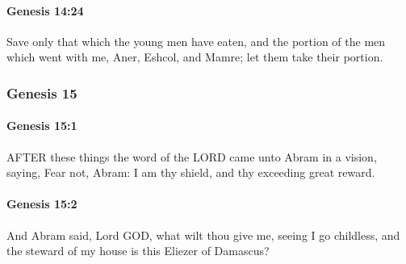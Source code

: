 		\paragraph{Genesis 14:24} %
			\label{GENESIS-14-24}

			Save only that which the young men have eaten, and the portion of the men which went with me, Aner, Eshcol, and Mamre; let them take their portion.


	\subsubsection{Genesis 15} %
		\label{GENESIS-15}
		
		\paragraph{Genesis 15:1} %
			\label{GENESIS-15-1}

			AFTER these things the word of the LORD came unto Abram in a vision, saying, Fear not, Abram: I am thy shield, and thy exceeding great reward.


		\paragraph{Genesis 15:2} %
			\label{GENESIS-15-2}

			And Abram said, Lord GOD, what wilt thou give me, seeing I go childless, and the steward of my house is this Eliezer of Damascus?

